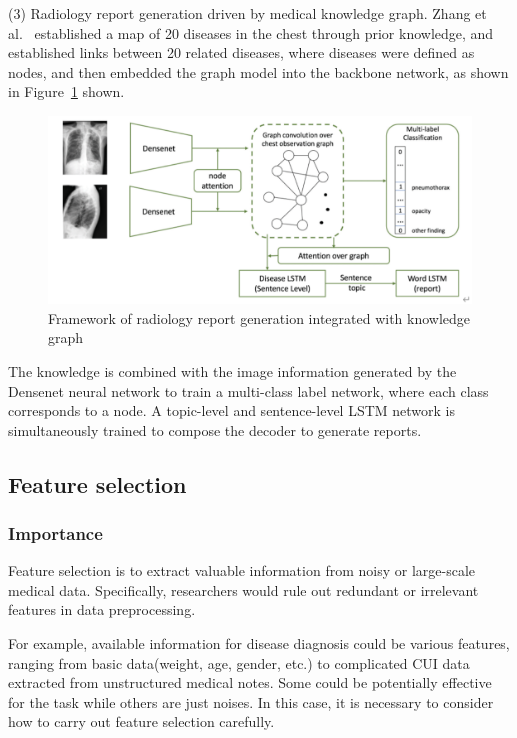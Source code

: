 (3) Radiology report generation driven by medical knowledge graph. Zhang et al.~\citet{2020When} established a map of 20 diseases in the chest through prior knowledge, and established links between 20 related diseases, where diseases were defined as nodes, and then embedded the graph model into the backbone network, as shown in Figure~\ref{fig:frog3} shown.

\begin{figure}[ht]
\centering
\includegraphics[width=1\textwidth]{images/3.3.3.png}
\caption{\label{fig:frog3}Framework of radiology report generation integrated with knowledge graph}
\end{figure}


The knowledge is combined with the image information generated by the Densenet neural network to train a multi-class label network, where each class corresponds to a node. A topic-level and sentence-level LSTM network is simultaneously trained to compose the decoder to generate reports.




\subsection{Feature selection} %

\subsubsection{Importance}
Feature selection is to extract valuable information from noisy or large-scale medical data. Specifically, researchers would rule out redundant or irrelevant features in data preprocessing. 

For example, available information for disease diagnosis could be various features, ranging from basic data(weight, age, gender, etc.) to complicated CUI data extracted from unstructured medical notes. Some could be potentially effective for the task while others are just noises. In this case, it is necessary to consider how to carry out feature selection carefully. 

